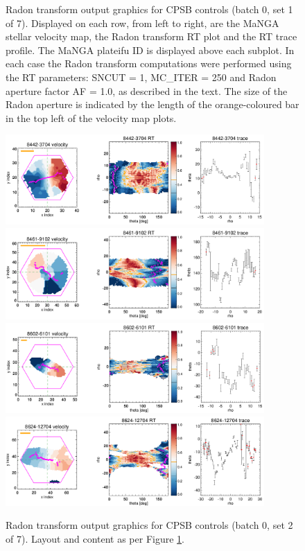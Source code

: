 \documentclass[fleqn,usenatbib]{mnras}
\begin{document}
\begin{figure}
    \caption{Radon transform output graphics for CPSB controls (batch 0, set 1 of 7). Displayed on each row, from left to right, are the MaNGA stellar velocity map, the Radon transform RT plot and the RT trace profile. The MaNGA plateifu ID is displayed above each subplot. In each case the Radon transform computations were performed using the RT parameters: SNCUT = 1, MC\_ITER = 250 and Radon aperture factor AF = 1.0, as described in the text. The size of the Radon aperture is indicated by the length of the orange-coloured bar in the top left of the velocity map plots.}
    \label{fig:CPSB-CTRL-0-triples-1}
\end{figure}

\begin{figure}
    \centering
    \includegraphics[width=0.88\textwidth]{Images/SN1-MC250/CPSB-CTRL-triples/CPSB-CTRL-8442-3704-1-250.png}
    \includegraphics[width=0.88\textwidth]{Images/SN1-MC250/CPSB-CTRL-triples/CPSB-CTRL-8461-9102-1-250.png}
    \includegraphics[width=0.88\textwidth]{Images/SN1-MC250/CPSB-CTRL-triples/CPSB-CTRL-8602-6101-1-250.png}
    \includegraphics[width=0.88\textwidth]{Images/SN1-MC250/CPSB-CTRL-triples/CPSB-CTRL-8624-12704-1-250.png}    
    \caption{Radon transform output graphics for CPSB controls (batch 0, set 2 of 7). Layout and content as per Figure \ref{fig:CPSB-CTRL-0-triples-1}.}
    \label{fig:CPSB-CTRL-0-triples-2}
\end{figure}
\end{document}
